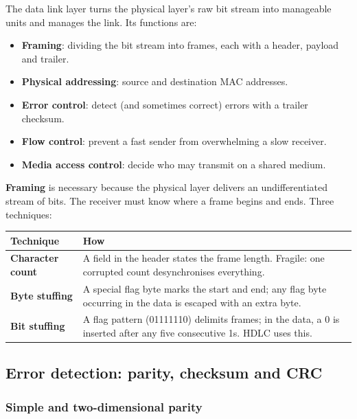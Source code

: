 \documentclass[11pt,a4paper]{article}
\begin{document}
\begin{solbox}
The data link layer turns the physical layer's raw bit stream into manageable units and manages the link. Its functions are:

\begin{itemize}
\item \textbf{Framing}: dividing the bit stream into frames, each with a header, payload and trailer.
\item \textbf{Physical addressing}: source and destination MAC addresses.
\item \textbf{Error control}: detect (and sometimes correct) errors with a trailer checksum.
\item \textbf{Flow control}: prevent a fast sender from overwhelming a slow receiver.
\item \textbf{Media access control}: decide who may transmit on a shared medium.
\end{itemize}

\textbf{Framing} is necessary because the physical layer delivers an undifferentiated stream of bits. The receiver must know where a frame begins and ends. Three techniques:

\begin{center}\small
\begin{tabularx}{\textwidth}{>{\bfseries}p{} X}
\toprule Technique & How\\
\midrule
Character count & A field in the header states the frame length. Fragile: one corrupted count desynchronises everything.\\
Byte stuffing & A special flag byte marks the start and end; any flag byte occurring in the data is escaped with an extra byte.\\
Bit stuffing & A flag pattern (01111110) delimits frames; in the data, a 0 is inserted after any five consecutive 1s. HDLC uses this.\\
\bottomrule
\end{tabularx}
\end{center}
\end{solbox}

\subsection{Error detection: parity, checksum and CRC}

\subsubsection{Simple and two-dimensional parity}
\end{document}
